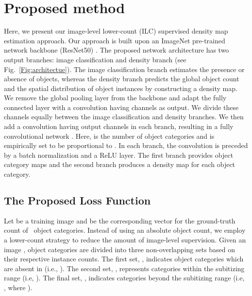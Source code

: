 \documentclass[10pt,twocolumn,letterpaper]{article}
\begin{document}
\section{Proposed method}
\vspace{-0.1cm}
\label{proposedmethod_start}
Here, we present our image-level lower-count (ILC) supervised density map estimation approach. 
Our approach is built upon an ImageNet pre-trained network backbone (ResNet50) \cite{ResNet}. The proposed network architecture has two output branches: image classification and density branch (see Fig.~\ref{Fig:architectue}). The image classification branch estimates the presence or absence of objects, whereas the density branch predicts the global object count and the spatial distribution of object instances by constructing a density map. We remove the global pooling layer from the backbone and adapt the fully connected layer with a  convolution having  channels as output. We  divide these  channels equally between the image classification and density branches. We then add a  convolution having  output channels in each branch, resulting in a fully convolutional network \cite{FCN}. Here,  is the number of object categories and  is empirically set to be proportional to . In each branch, the convolution is preceded by a batch normalization and a ReLU layer. The first branch provides object category maps and the second branch produces a density map for each object category.










\vspace{-0.1cm}
\subsection{The Proposed Loss Function}
\vspace{-0.1cm}
Let  be a training image and  be the corresponding vector for the ground-truth count of ~object categories. Instead of using an absolute object count, we employ a lower-count strategy to reduce the amount of image-level supervision. Given an image , object categories are divided into three  non-overlapping sets based on their respective instance counts. The first set, , indicates object categories which are absent in  (i.e., ). The second set, , represents categories within the subitizing range (i.e, ). The final set, , indicates categories beyond the subitizing range (i.e, , where ).
\end{document}
